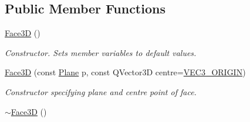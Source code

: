 \subsection*{Public Member Functions}
\begin{DoxyCompactItemize}
\item 
\hypertarget{class_face3_d_af64a4a5fe2a8f06dd684bff91041e0cb}{\hyperlink{class_face3_d_af64a4a5fe2a8f06dd684bff91041e0cb}{Face3\-D} ()}\label{class_face3_d_af64a4a5fe2a8f06dd684bff91041e0cb}

\begin{DoxyCompactList}\small\item\em Constructor. Sets member variables to default values. \end{DoxyCompactList}\item 
\hyperlink{class_face3_d_a6113068475ee9edc57445f8eac3d4f5b}{Face3\-D} (const \hyperlink{class_plane}{Plane} p, const Q\-Vector3\-D centre=\hyperlink{matlib_8h_ac2de4dab97258eff87e0a1253a2d1a29}{V\-E\-C3\-\_\-\-O\-R\-I\-G\-I\-N})
\begin{DoxyCompactList}\small\item\em Constructor specifying plane and centre point of face. \end{DoxyCompactList}\item 
\hypertarget{class_face3_d_af7dc0f5eb3359689d7617cad7fe65797}{\hyperlink{class_face3_d_af7dc0f5eb3359689d7617cad7fe65797}{$\sim$\-Face3\-D} ()}\label{class_face3_d_af7dc0f5eb3359689d7617cad7fe65797}


\end{DoxyCompactItemize}
